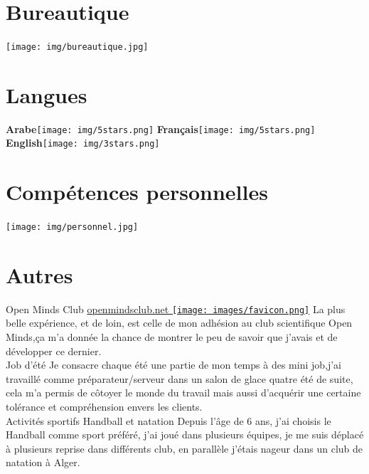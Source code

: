 \documentclass[]{friggeri-cv}
\begin{document}
\begin{aside}
~
~
~
~
  \section{Bureautique}
    \texttt{[image: img/bureautique.jpg]}
    ~
    ~
  \section{Langues}
    \textbf{Arabe}\texttt{[image: img/5stars.png]}
    \textbf{Français}\texttt{[image: img/5stars.png]}
    \textbf{English}\texttt{[image: img/3stars.png]}
    ~
    ~
  \section{Compétences personnelles}
    \texttt{[image: img/personnel.jpg]}
    ~
\end{aside}

\section{Autres}
\begin{entrylist}
   \entry
    { }
    {Open Minds Club}
    {\href{http://www.openmindsclub.net}{openmindsclub.net \texttt{[image: images/favicon.png]}}}
    {La plus belle expérience, et de loin, est celle de mon adhésion au club scientifique Open Minds,ça m'a donnée la chance de montrer le peu de savoir que j'avais et de développer ce dernier.\\}
  \entry
    {}
    {Job d'été}
    {}
    {Je consacre chaque été une partie de mon temps à des mini job,j'ai travaillé comme préparateur/serveur dans un salon de glace quatre été de suite, cela m'a permis de côtoyer le monde du travail mais aussi d’acquérir une certaine tolérance et compréhension envers les clients.\\}
  \entry
    { }
    {Activités sportifs}
    {Handball et natation}
    {Depuis l'âge de 6 ans, j'ai choisis le Handball comme sport préféré, j'ai joué dans plusieurs équipes, je me suis déplacé à plusieurs reprise dans différents club, en parallèle j'étais nageur dans un club de natation à Alger.\\}
\end{entrylist}
\end{document}
